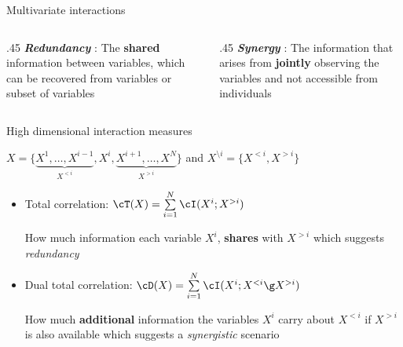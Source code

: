 \begin{frame}{Multivariate interactions}
\begin{columns}
\begin{column}{.45\textwidth}
\textit{\textbf{Redundancy }}: The \textbf{shared} information between variables, which can be recovered from variables or subset of variables
\newline
\end{column}
\begin{column}{.45\textwidth}
\textit{\textbf{Synergy }}: The information that arises from \textbf{jointly} observing the variables and not accessible from individuals
\newline
\end{column}
\end{columns}
\begin{figure}
    \centering
    
\end{figure}
\end{frame}





\begin{frame}{High dimensional interaction measures}

$X = \{ \underbrace{ X^1,\dots,X^{i-1}}_{X^{<i} } ,X^i,\underbrace{X^{i+1},\dots,X^N}_{X^{>i}}  \} $ and $X^{\setminus i}=\{X^{<i},X^{>i}\}$



\begin{itemize}
\item Total correlation: $\cT(X) = \sum\limits_{i=1}^{N} \cI(X^i;X^{>i})$ 
    
    How much information each variable $X^i$, \textbf{shares} with $X^{>i}$ which suggests \textit{redundancy} 
    
\item Dual total correlation: $\cD( X) = \sum\limits_{i=1}^{N}   \cI(X^i;X^{<i} \g X^{>i})$

How much \textbf{additional} information the variables $X^i$ carry about $X^{<i}$ if  $ X^{>i}$ is also available which suggests a \textit{synergistic} scenario



\end{itemize}
\end{frame}



